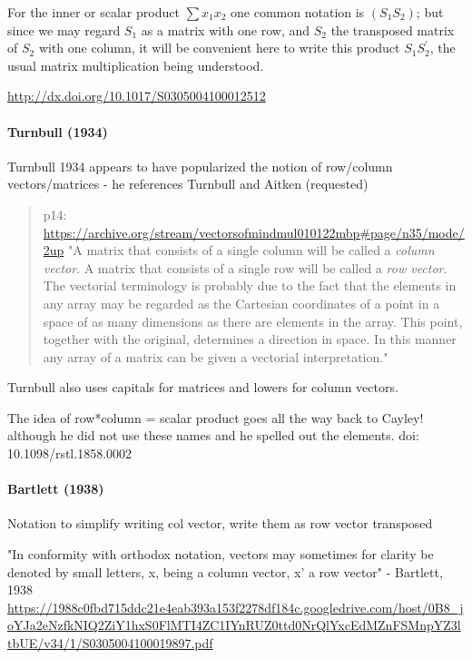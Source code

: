 For the
inner or scalar product $\sum x_1 x_2 $
 one common notation is $(S_1 S_2)$; but
since we may regard $S_1$ as a matrix with one row, and $S_2$ the
transposed matrix of $S_2$ with one column, it will be convenient here
to write this product $S_1 S_2^\prime$, the usual matrix multiplication being
understood.

\url{http://dx.doi.org/10.1017/S0305004100012512}



\paragraph{Turnbull (1934)}

Turnbull 1934 appears to have popularized the notion of row/column vectors/matrices - he references Turnbull and Aitken (requested)

\begin{quote}
p14: \url{https://archive.org/stream/vectorsofmindmul010122mbp#page/n35/mode/2up}
"A matrix that consists of a single column will be called a \textit{column vector}. A
matrix that consists of a single row will be called a \textit{row vector}. The
vectorial terminology is probably due to the fact that the elements in any
array may be regarded as the Cartesian coordinates of a point in a space of as
many dimensions as there are elements in the array. This point, together with
the original, determines a direction in space. In this manner any array of a
matrix can be given a vectorial interpretation."
\end{quote}

Turnbull also uses capitals for matrices and lowers for column vectors.

The idea of row*column = scalar product goes all the way back to Cayley! although he did not use these names and he spelled out the elements.
doi: 10.1098/rstl.1858.0002



\paragraph{Bartlett (1938)}

Notation to simplify writing col vector, write them as row vector transposed

"In conformity with orthodox notation, vectors may sometimes for clarity be denoted by small letters, x, being a column vector, x' a row vector" - Bartlett, 1938 \url{https://1988c0fbd715ddc21e4eab393a153f2278df184c.googledrive.com/host/0B8_joYJa2eNzfkNIQ2ZiY1hxS0FlMTI4ZC1IYnRUZ0ttd0NrQlYxcEdMZnFSMnpYZ3ltbUE/v34/1/S0305004100019897.pdf}

